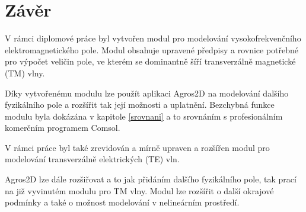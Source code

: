 \documentclass[12pt,a4paper,oneside]{article}
\numberwithin{equation}{section} %
\numberwithin{figure}{section} %
\numberwithin{table}{section} %
\begin{document}
\clearpage %
\section{Závěr}
V rámci diplomové práce byl vytvořen modul pro modelování vysokofrekvenčního elektromagnetického pole. Modul obsahuje upravené předpisy a rovnice potřebné pro výpočet veličin pole, ve kterém se dominantně šíří transverzálně magnetické (TM) vlny.

Díky vytvořenému modulu lze použít aplikaci Agros2D na modelování dalšího fyzikálního pole a rozšířit tak její možnosti a uplatnění. Bezchybná funkce modulu byla dokázána v kapitole \ref{srovnani} a to srovnáním s profesionálním komerčním programem Comsol.

V rámci práce byl také zrevidován a mírně upraven a rozšířen modul pro modelování transverzálně elektrických (TE) vln.

Agros2D lze dále rozšiřovat a to jak přidáním dalšího fyzikálního pole, tak prací na již vyvinutém modulu pro TM vlny. Modul lze rozšířit o další okrajové podmínky a také o možnost modelování v nelineárním prostředí.
\end{document}
